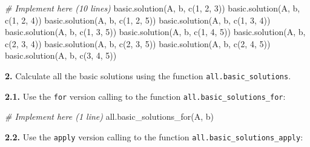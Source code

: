 \documentclass[
]{article}
\newenvironment{Shaded}{\begin{snugshade}}{\end{snugshade}}
\newcommand{\CommentTok}[1]{\textcolor[rgb]{0.56,0.35,0.01}{\textit{#1}}}
\newcommand{\DecValTok}[1]{\textcolor[rgb]{0.00,0.00,0.81}{#1}}
\newcommand{\FunctionTok}[1]{\textcolor[rgb]{0.00,0.00,0.00}{#1}}
\newcommand{\NormalTok}[1]{#1}
\begin{document}
\begin{Shaded}
\begin{Highlighting}[]
\CommentTok{\# Implement here (10 lines)}
\FunctionTok{basic.solution}\NormalTok{(A, b, }\FunctionTok{c}\NormalTok{(}\DecValTok{1}\NormalTok{, }\DecValTok{2}\NormalTok{, }\DecValTok{3}\NormalTok{))}
\FunctionTok{basic.solution}\NormalTok{(A, b, }\FunctionTok{c}\NormalTok{(}\DecValTok{1}\NormalTok{, }\DecValTok{2}\NormalTok{, }\DecValTok{4}\NormalTok{))}
\FunctionTok{basic.solution}\NormalTok{(A, b, }\FunctionTok{c}\NormalTok{(}\DecValTok{1}\NormalTok{, }\DecValTok{2}\NormalTok{, }\DecValTok{5}\NormalTok{))}
\FunctionTok{basic.solution}\NormalTok{(A, b, }\FunctionTok{c}\NormalTok{(}\DecValTok{1}\NormalTok{, }\DecValTok{3}\NormalTok{, }\DecValTok{4}\NormalTok{))}
\FunctionTok{basic.solution}\NormalTok{(A, b, }\FunctionTok{c}\NormalTok{(}\DecValTok{1}\NormalTok{, }\DecValTok{3}\NormalTok{, }\DecValTok{5}\NormalTok{))}
\FunctionTok{basic.solution}\NormalTok{(A, b, }\FunctionTok{c}\NormalTok{(}\DecValTok{1}\NormalTok{, }\DecValTok{4}\NormalTok{, }\DecValTok{5}\NormalTok{))}
\FunctionTok{basic.solution}\NormalTok{(A, b, }\FunctionTok{c}\NormalTok{(}\DecValTok{2}\NormalTok{, }\DecValTok{3}\NormalTok{, }\DecValTok{4}\NormalTok{))}
\FunctionTok{basic.solution}\NormalTok{(A, b, }\FunctionTok{c}\NormalTok{(}\DecValTok{2}\NormalTok{, }\DecValTok{3}\NormalTok{, }\DecValTok{5}\NormalTok{))}
\FunctionTok{basic.solution}\NormalTok{(A, b, }\FunctionTok{c}\NormalTok{(}\DecValTok{2}\NormalTok{, }\DecValTok{4}\NormalTok{, }\DecValTok{5}\NormalTok{))}
\FunctionTok{basic.solution}\NormalTok{(A, b, }\FunctionTok{c}\NormalTok{(}\DecValTok{3}\NormalTok{, }\DecValTok{4}\NormalTok{, }\DecValTok{5}\NormalTok{))}
\end{Highlighting}
\end{Shaded}

\textbf{2.} Calculate all the basic solutions using the function
\texttt{all.basic\_solutions}.

\textbf{2.1.} Use the \texttt{for} version calling to the function
\texttt{all.basic\_solutions\_for}:

\begin{Shaded}
\begin{Highlighting}[]
\CommentTok{\# Implement here (1 line)}
\FunctionTok{all.basic\_solutions\_for}\NormalTok{(A, b)}
\end{Highlighting}
\end{Shaded}

\textbf{2.2.} Use the \texttt{apply} version calling to the function
\texttt{all.basic\_solutions\_apply}:
\end{document}
